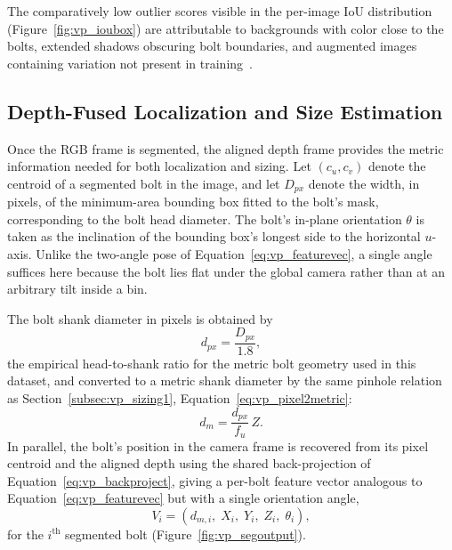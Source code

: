 The comparatively low outlier scores visible in the per-image IoU distribution
(Figure~\ref{fig:vp_ioubox}) are attributable to backgrounds with color close to the bolts,
extended shadows obscuring bolt boundaries, and augmented images containing variation not present
in training~\citep{sk2024boltsorting}.

\subsection{Depth-Fused Localization and Size Estimation}\label{subsec:vp_sizing2}

Once the RGB frame is segmented, the aligned depth frame provides the metric information needed
for both localization and sizing. Let $(c_u, c_v)$ denote the centroid of a segmented bolt in the
image, and let $D_{px}$ denote the width, in pixels, of the minimum-area bounding box fitted to the
bolt's mask, corresponding to the bolt head diameter. The bolt's
in-plane orientation $\theta$ is taken as the inclination of the bounding box's longest side to the
horizontal $u$-axis. Unlike the two-angle pose of Equation~\eqref{eq:vp_featurevec}, a single angle
suffices here because the bolt lies flat under the global camera rather than at an arbitrary tilt
inside a bin.


The bolt shank diameter in pixels is obtained by
\begin{equation}
d_{px} = \frac{D_{px}}{1.8},
\label{eq:vp_shankpx}
\end{equation}
the empirical head-to-shank ratio for the metric bolt geometry used in this dataset, and converted
to a metric shank diameter by the same pinhole relation as Section~\ref{subsec:vp_sizing1},
Equation~\eqref{eq:vp_pixel2metric}:
\begin{equation}
d_m = \frac{d_{px}}{f_u}\,Z.
\label{eq:vp_shankm}
\end{equation}
In parallel, the bolt's position in the camera frame is recovered from its pixel centroid and the
aligned depth using the shared back-projection of Equation~\eqref{eq:vp_backproject}, giving a
per-bolt feature vector analogous to Equation~\eqref{eq:vp_featurevec} but with a single orientation
angle,
\begin{equation}
V_i = \left( d_{m,i},\; X_i,\; Y_i,\; Z_i,\; \theta_i \right),
\label{eq:vp_featurevec2}
\end{equation}
for the $i^{\text{th}}$ segmented bolt (Figure~\ref{fig:vp_segoutput}).

